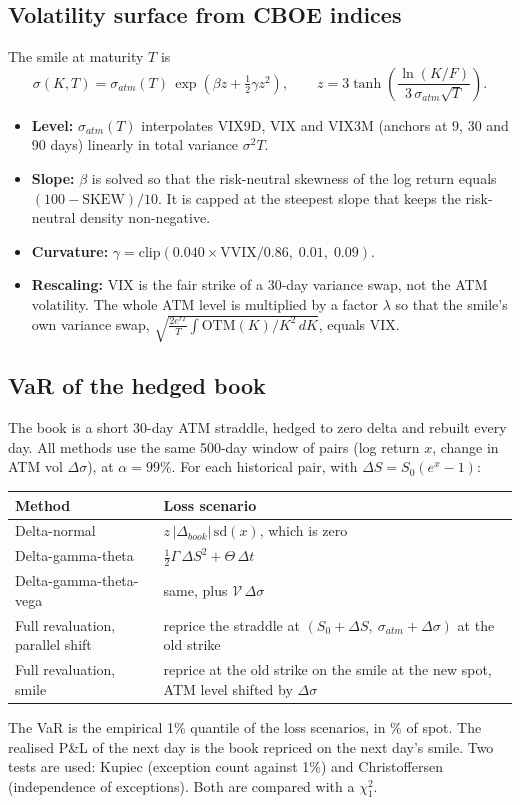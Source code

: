 \documentclass[11pt,a4paper]{article}
\begin{document}
\subsection{Volatility surface from CBOE indices}
The smile at maturity $T$ is
\[
\sigma(K,T)=\sigma_{atm}(T)\,\exp\!\left(\beta z+\tfrac12\gamma z^2\right),\qquad
z=3\tanh\!\left(\frac{\ln(K/F)}{3\,\sigma_{atm}\sqrt T}\right).
\]
\begin{itemize}
\item \textbf{Level:} $\sigma_{atm}(T)$ interpolates VIX9D, VIX and VIX3M (anchors at 9, 30 and 90 days) linearly in total variance $\sigma^2T$.
\item \textbf{Slope:} $\beta$ is solved so that the risk-neutral skewness of the log return equals $(100-\mathrm{SKEW})/10$. It is capped at the steepest slope that keeps the risk-neutral density non-negative.
\item \textbf{Curvature:} $\gamma=\mathrm{clip}(0.040\times\mathrm{VVIX}/0.86,\;0.01,\;0.09)$.
\item \textbf{Rescaling:} VIX is the fair strike of a 30-day variance swap, not the ATM volatility. The whole ATM level is multiplied by a factor $\lambda$ so that the smile's own variance swap, $\sqrt{\tfrac{2e^{rT}}{T}\int \mathrm{OTM}(K)/K^2\,dK}$, equals VIX.
\end{itemize}

\subsection{VaR of the hedged book}
The book is a short 30-day ATM straddle, hedged to zero delta and rebuilt every day. All methods use the same 500-day window of pairs (log return $x$, change in ATM vol $\Delta\sigma$), at $\alpha=99\%$. For each historical pair, with $\Delta S=S_0(e^{x}-1)$:

\begin{center}
\begin{tabular}{@{}lp{9.2cm}@{}}
\toprule
Method & Loss scenario \\
\midrule
Delta-normal & $z\,|\Delta_{book}|\,\mathrm{sd}(x)$, which is zero \\[2pt]
Delta-gamma-theta & $\tfrac12\Gamma\,\Delta S^2+\Theta\,\Delta t$ \\[2pt]
Delta-gamma-theta-vega & same, plus $\mathcal{V}\,\Delta\sigma$ \\[2pt]
Full revaluation, parallel shift & reprice the straddle at $(S_0+\Delta S,\ \sigma_{atm}+\Delta\sigma)$ at the old strike \\[2pt]
Full revaluation, smile & reprice at the old strike on the smile at the new spot, ATM level shifted by $\Delta\sigma$ \\
\bottomrule
\end{tabular}
\end{center}
The VaR is the empirical 1\% quantile of the loss scenarios, in \% of spot. The realised P\&L of the next day is the book repriced on the next day's smile. Two tests are used: Kupiec (exception count against 1\%) and Christoffersen (independence of exceptions). Both are compared with a $\chi^2_1$.
\end{document}
